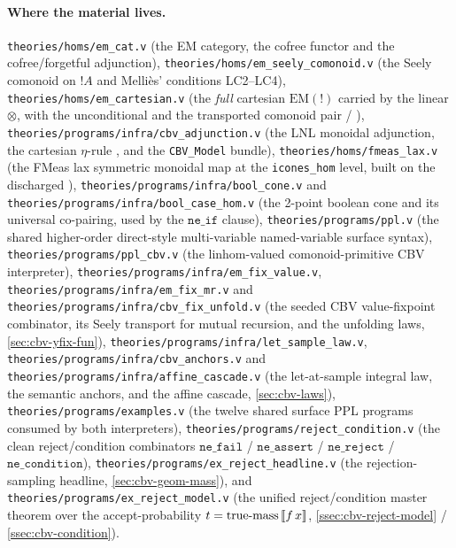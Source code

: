 \paragraph{Where the material lives.}
\texttt{theories/homs/em\_cat.v} (the EM category, the cofree functor and
the cofree/forgetful adjunction), \texttt{theories/homs/em\_seely\_comonoid.v}
(the Seely comonoid on $\mathord{!}A$ and Melli\`es' conditions
LC2--LC4), \texttt{theories/homs/em\_cartesian.v} (the \emph{full}
cartesian $\mathrm{EM}(\mathord{!})$ carried by the linear $\otimes$,
with the unconditional  and the
transported comonoid pair  /
),
\texttt{theories/programs/infra/cbv\_adjunction.v} (the LNL monoidal
adjunction, the cartesian $\eta$-rule
, and the
\texttt{CBV\_Model} bundle), \texttt{theories/homs/fmeas\_lax.v} (the
FMeas lax symmetric monoidal map at the \texttt{icones\_hom} level,
built on the discharged
),
\texttt{theories/programs/infra/bool\_cone.v} and
\texttt{theories/programs/infra/bool\_case\_hom.v} (the 2-point boolean
cone and its universal co-pairing, used by the $\mathtt{ne\_if}$ clause),
\texttt{theories/programs/ppl.v} (the shared higher-order direct-style
multi-variable named-variable surface syntax),
\texttt{theories/programs/ppl\_cbv.v} (the linhom-valued
comonoid-primitive CBV interpreter),
\texttt{theories/programs/infra/em\_fix\_value.v},
\texttt{theories/programs/infra/em\_fix\_mr.v} and
\texttt{theories/programs/infra/cbv\_fix\_unfold.v} (the seeded CBV
value-fixpoint combinator, its Seely transport for mutual recursion,
and the unfolding laws,
\autoref{sec:cbv-yfix-fun}),
\texttt{theories/programs/infra/let\_sample\_law.v},
\texttt{theories/programs/infra/cbv\_anchors.v} and
\texttt{theories/programs/infra/affine\_cascade.v} (the let-at-sample
integral law, the semantic anchors, and the affine cascade,
\autoref{sec:cbv-laws}),
\texttt{theories/programs/examples.v} (the twelve shared surface PPL
programs consumed by both interpreters),
\texttt{theories/programs/reject\_condition.v} (the clean
reject/condition combinators $\mathtt{ne\_fail}$ / $\mathtt{ne\_assert}$
/ $\mathtt{ne\_reject}$ / $\mathtt{ne\_condition}$),
\texttt{theories/programs/ex\_reject\_headline.v} (the
rejection-sampling headline, \autoref{sec:cbv-geom-mass}), and
\texttt{theories/programs/ex\_reject\_model.v} (the unified
reject/condition master theorem over the accept-probability
$t = \mathrm{true\text{-}mass}\,[\![ f\,x ]\!]$,
\autoref{ssec:cbv-reject-model} / \autoref{ssec:cbv-condition}).

